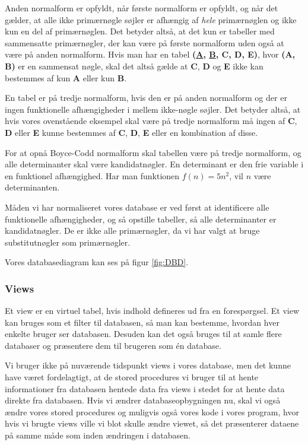 Anden normalform er opfyldt, når første normalform er opfyldt, og når det gælder, at alle ikke primærnøgle søjler er afhængig af \textit{hele} primærnøglen og ikke kun en del af primærnøglen.
Det betyder altså, at det kun er tabeller med sammensatte primærnøgler, der kan være på første normalform uden også at være på anden normalform. Hvis man har en tabel \textbf{(\underline{A}, \underline{B}, C, D, E)}, hvor \textbf{(A, B)} er en sammensat nøgle, skal det altså gælde at \textbf{C}, \textbf{D} og \textbf{E} ikke kan bestemmes af kun \textbf{A} eller kun \textbf{B}.

En tabel er på tredje normalform, hvis den er på anden normalform og der er ingen funktionelle afhængigheder i mellem ikke-nøgle søjler.
Det betyder altså, at hvis vores ovenstående eksempel skal være på tredje normalform må ingen af \textbf{C}, \textbf{D} eller \textbf{E} kunne bestemmes af \textbf{C}, \textbf{D}, \textbf{E} eller en kombination af disse.

For at opnå Boyce-Codd normalform skal tabellen være på tredje normalform, og alle determinanter skal være kandidatnøgler.
En determinant er den frie variable i en funktionel afhængighed. Har man funktionen \(f(n) = 5n^2 \), vil \(n\) være determinanten.\cite{database}

Måden vi har normaliseret vores database er ved først at identificere alle funktionelle afhængigheder, og så opstille tabeller, så alle determinanter er kandidatnøgler.
De er ikke alle primærnøgler, da vi har valgt at bruge substitutnøgler som primærnøgler.

Vores databasediagram kan ses på figur \ref{fig:DBD}.

\subsubsection{Views}

Et view er en virtuel tabel, hvis indhold defineres ud fra en forespørgsel.
Et view kan bruges som et filter til databasen, så man kan bestemme, hvordan hver enkelte bruger ser databasen.
Desuden kan det også bruges til at samle flere databaser og præsentere dem til brugeren som én database.

Vi bruger ikke på nuværende tidspunkt views i vores database, men det kunne have været fordelagtigt, at de stored procedures vi bruger til at hente informationer fra databasen hentede data fra views i stedet for at hente data direkte fra databasen.
Hvis vi ændrer databaseopbygningen nu, skal vi også ændre vores stored procedures og muligvis også vores kode i vores program, hvor hvis vi brugte views ville vi blot skulle ændre viewet, så det præsenterer dataene på samme måde som inden ændringen i databasen.

